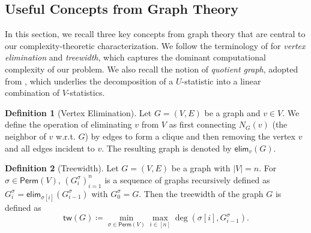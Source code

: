\documentclass[sn-mathphys, natbib=false]{sn-jnl}
\theoremstyle{plain}
\theoremstyle{definition}
\newtheorem{definition}{Definition}
\newcommand{\sPi}{\pi}
\newcommand{\sper}{\sigma}
\newcommand{\perm}[1]{\mathsf{Perm}(#1)}
\newcommand{\partition}{\Pi}
\newcommand{\partitionp}[1]{\partition_{#1}}
\newcommand{\degp}[2]{\deg(#1,#2)}
\newcommand{\neighborvg}[2]{N_{#2}(#1)}
\newcommand{\treewidthp}[1]{\mathsf{tw}(#1)}
\newcommand{\eliminatevg}[2]{\mathsf{elim}_{#1}(#2)}
\begin{document}
\begin{bibunit}[agsm]
\subsection{Useful Concepts from Graph Theory}
\label{sec:graph}

In this section, we recall three key concepts from graph theory that are central 
to our complexity-theoretic characterization. We follow the terminology of 
\citet{bodlaender2010treewidth} for \emph{vertex elimination} and \emph{treewidth}, 
which captures the dominant computational complexity of our problem. 
We also recall the notion of \emph{quotient graph}, adopted from 
\citet{sanders2012high}, which underlies the decomposition of a $U$-statistic 
into a linear combination of $V$-statistics.

\begin{definition}[Vertex Elimination]
\label{def:vertex_elimination}
Let $G = (V, E)$ be a graph and $v \in V$. We define the operation of eliminating $v$ from $V$ as first connecting $\neighborvg{v}{G}$ (the neighbor of $v$ w.r.t. $G$) by edges to form a clique and then removing the vertex $v$ and all edges incident to $v$. The resulting graph is denoted by $\eliminatevg{v}{G}$. 
\end{definition}

\begin{definition}[Treewidth]
\label{def:treewidth_elimination}
Let $G = (V, E)$ be a graph with $|V| = n$. For $\sigma \in \perm{V}$, $(G_i^{\sigma})_{i=1}^n$ is a sequence of graphs recursively defined as $G_i^\sigma = \eliminatevg{\sigma[i]}{G_{i-1}^\sigma}$ with $G_0^\sigma = G$. Then the treewidth of the graph $G$ is defined as 
\begin{equation*}
\treewidthp{G} \coloneqq \min_{\sigma \in \perm{V}} \max_{i \in [n]} \degp{\sper[i]}{G_{i-1}^\sigma}. 
\end{equation*}
\end{definition}


\end{bibunit}
\end{document}
